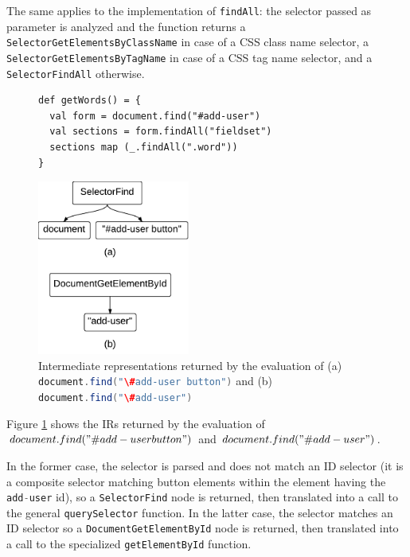 \documentclass{llncs}
\newcommand{\code}[1]{\lstinline[language=Scala,columns=fixed,basicstyle=\footnotesize]|#1|}
\begin{document}
The same applies to the implementation of \code{findAll}: the selector passed as parameter is
analyzed and the function returns a \code{SelectorGetElementsByClassName} in case of a CSS class
name selector, a \code{SelectorGetElementsByTagName} in case of a CSS tag name selector, and a
\code{SelectorFindAll} otherwise.

\begin{figure}[htb]
\begin{lstlisting}[label=js-scala-selectors,caption=Searching elements in js-scala]
def getWords() = {
  val form = document.find("#add-user")
  val sections = form.findAll("fieldset")
  sections map (_.findAll(".word"))
}
\end{lstlisting}
\end{figure}

\begin{figure}[htb]
\begin{center}
\includegraphics[width=5cm]{gpce19c-foy-ir.pdf}
\end{center}
\caption{Intermediate representations returned by the evaluation of (a)
\code{document.find("\#add-user button")} and (b) \code{document.find("\#add-user")}}
\label{fig:ir}
\end{figure}

\vspace{1 cm}

Figure \ref{fig:ir} shows the IRs returned by the evaluation of \small{
$document\\.find("\#add-user button")$} \normalsize{and}  \small{$ document.find("\#add-user")$}.

\normalsize{}

\sloppy
In the former case, the selector is parsed and does not match an ID selector (it is a composite
selector matching button elements within the element having the \code{add-user} id), so a
\code{SelectorFind} node is returned, then translated into a call to the general
\code{querySelector} function. In the latter case, the selector matches an ID selector so a
\code{DocumentGetElementById} node is returned, then translated into a call to the specialized
\code{getElementById} function.
\end{document}

